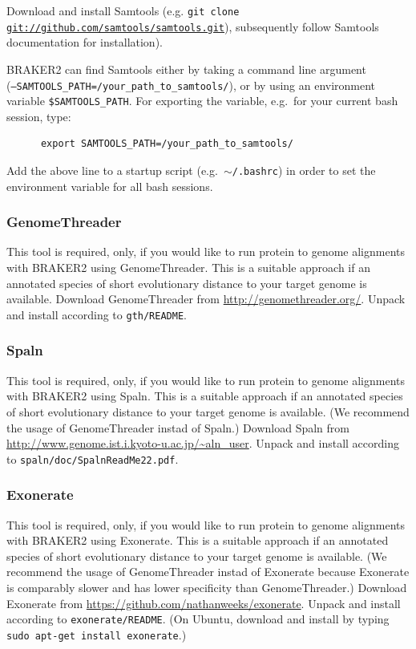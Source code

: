 \documentclass[a4paper,10pt]{report}
\begin{document}
      Download and install Samtools (e.g. \texttt{git clone \url{git://github.com/samtools/samtools.git}}), 
      subsequently follow Samtools documentation for installation).    

      BRAKER2 can find Samtools either by taking a command line argument\\ (\texttt{--SAMTOOLS\_PATH=/your\_path\_to\_samtools/}), or by using an environment variable \texttt{\$SAMTOOLS\_PATH}. For exporting the variable, e.g.~for your current bash session, type:

    \begin{verbatim}
      export SAMTOOLS_PATH=/your_path_to_samtools/
    \end{verbatim}
    
        Add the above line to a startup script (e.g.~\texttt{$\sim$/.bashrc}) in order to set the environment variable for all bash sessions.
\subsubsection{GenomeThreader}

This tool is required, only, if you would like to run protein to genome alignments with BRAKER2 using GenomeThreader. This is a suitable approach if an annotated species of short evolutionary distance to your target genome is available. Download GenomeThreader from \url{http://genomethreader.org/}. Unpack and install according to \texttt{gth/README}.

\subsubsection{Spaln}

This tool is required, only, if you would like to run protein to genome alignments with BRAKER2 using Spaln. This is a suitable approach if an annotated species of short evolutionary distance to your target genome is available. (We recommend the usage of GenomeThreader instad of Spaln.) Download Spaln from \url{http://www.genome.ist.i.kyoto-u.ac.jp/~aln_user}. Unpack and install according to \texttt{spaln/doc/SpalnReadMe22.pdf}.

\subsubsection{Exonerate}

This tool is required, only, if you would like to run protein to genome alignments with BRAKER2 using Exonerate. This is a suitable approach if an annotated species of short evolutionary distance to your target genome is available. (We recommend the usage of GenomeThreader instad of Exonerate because Exonerate is comparably slower and has lower specificity than GenomeThreader.) Download Exonerate from \url{https://github.com/nathanweeks/exonerate}. Unpack and install according to \texttt{exonerate/README}. (On Ubuntu, download and install by typing  \texttt{sudo apt-get install exonerate}.)
\end{document}
